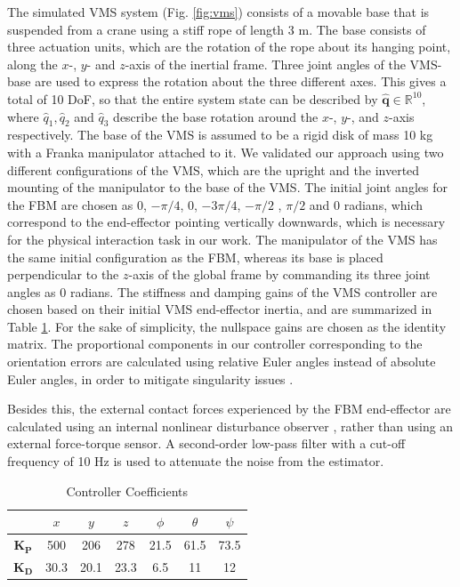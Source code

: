 \documentclass[../main.tex]{subfiles}
\begin{document}
The simulated VMS system (Fig. \ref{fig:vms}) consists of a movable base that is suspended from a crane using a stiff rope of length 3 m. The base consists of three actuation units, which are the rotation of the rope about its hanging point, along the $x$-, $y$- and $z$-axis of the inertial frame. Three joint angles of the VMS-base are used to express the rotation about the three different axes. This gives a total of 10 DoF, so that the entire system state can be described by $\hat{\bm{q}} \in \mathbb{R}^{10}$, where $\hat{q}_1, \hat{q}_2$ and $\hat{q}_3$ describe the base rotation around the $x$-, $y$-, and $z$-axis respectively. The base of the VMS is assumed to be a rigid disk of mass 10 kg with a Franka manipulator attached to it. We validated our approach using two different configurations of the VMS, which are the upright and the inverted mounting of the manipulator to the base of the VMS. The initial joint angles for the FBM are chosen as ${0}$, $-{\pi /4}$, ${0}$, $-{3\pi /4}$, $-{\pi /2}$ , ${\pi /2}$ and ${0}$ radians, which correspond to the end-effector pointing vertically downwards, which is necessary for the physical interaction task in our work. The manipulator of the VMS has the same initial configuration as the FBM, whereas its base is placed perpendicular to the $z$-axis of the global frame by commanding its three joint angles as 0 radians.
The stiffness and damping gains of the VMS controller are chosen based on their initial VMS end-effector inertia, and are summarized in Table \ref{table:coeff}.
For the sake of simplicity, the nullspace gains are chosen as the identity matrix. The proportional components in our controller corresponding to the orientation errors are calculated  using relative Euler angles  instead of absolute Euler angles, in order to mitigate singularity issues \cite{caccavale1999six}. 

Besides this, the external contact forces experienced by the FBM end-effector are calculated using an internal nonlinear disturbance observer \cite{haddadin2022}, rather than using an external force-torque sensor. A second-order low-pass filter with a cut-off frequency of 10 Hz is used to attenuate the noise from the estimator.
\begin{table}[h!]
  \centering
   \caption[Controller Coefficients]{\centering Controller Coefficients}
    \label{table:coeff}
\begin{tabular}{|c||c|c|c|c|c|c|}
\hline
 & $x$ & $y$ & $z$ & $\phi$ & $\theta$ & $\psi$\\
\hline
\hline
$\bm{K_P}$& 500 & 206 & 278 & 21.5 & 61.5 & 73.5\\
\hline
$\bm{K_D}$  & 30.3 & 20.1 & 23.3 & 6.5 & 11 & 12 \\
\hline
\end{tabular}
\end{table}
\end{document}
